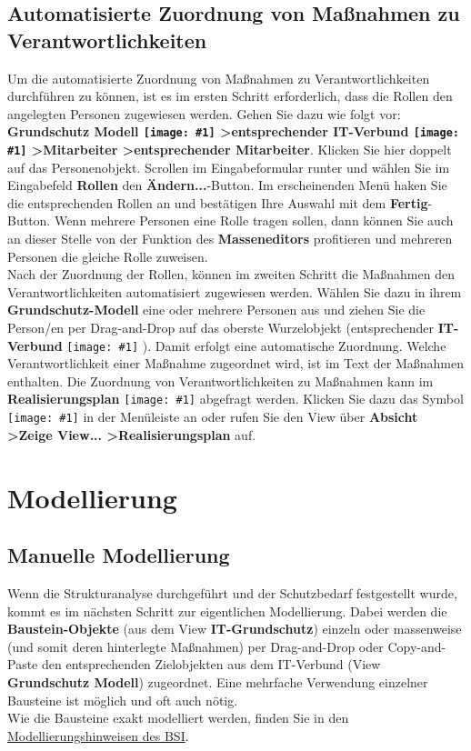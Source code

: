 \documentclass[a4paper,10pt]{book}
\newcommand{\icon}[1]{\texttt{[image: \#1]}}
\begin{document}
\subsection{Automatisierte Zuordnung von Maßnahmen zu Verantwortlichkeiten}
Um die automatisierte Zuordnung von Maßnahmen zu Verantwortlichkeiten durchführen zu können, ist es im ersten Schritt erforderlich, dass die Rollen den angelegten Personen zugewiesen werden. Gehen Sie dazu wie folgt vor: \textbf{Grundschutz Modell \icon{Icon/GS_Modell.png} \textgreater entsprechender IT-Verbund \icon{Icon/GS_Modell.png} \textgreater Mitarbeiter \textgreater entsprechender Mitarbeiter}. Klicken Sie hier doppelt auf das Personenobjekt. Scrollen im Eingabeformular runter und wählen Sie im Eingabefeld \textbf{Rollen} den \textbf{Ändern...}-Button. Im erscheinenden Menü haken Sie die entsprechenden Rollen an und bestätigen Ihre Auswahl mit dem \textbf{Fertig}-Button. Wenn mehrere Personen eine Rolle tragen sollen, dann können Sie auch an dieser Stelle von der Funktion des \textbf{Masseneditors} profitieren und mehreren Personen die gleiche Rolle zuweisen.
\newline\\
Nach der Zuordnung der Rollen, können im zweiten Schritt die Maßnahmen den Verantwortlichkeiten automatisiert zugewiesen werden. Wählen Sie dazu in ihrem \textbf{Grundschutz-Modell} eine oder mehrere Personen aus und ziehen Sie die Person/en per Drag-and-Drop auf das oberste Wurzelobjekt (entsprechender \textbf{IT-Verbund} \icon{Icon/GS_Modell.png} ). Damit erfolgt eine automatische Zuordnung. Welche Verantwortlichkeit einer Maßnahme zugeordnet wird, ist im Text der Maßnahmen enthalten.
Die Zuordnung von Verantwortlichkeiten zu Maßnahmen kann im \textbf{Realisierungsplan} \icon{Icon/Okay.png} abgefragt werden. Klicken Sie dazu das Symbol \icon{Icon/Okay.png} in der Menüleiste an oder rufen Sie den View über \textbf{Absicht \textgreater Zeige View... \textgreater Realisierungsplan} auf.

\section{Modellierung}

\subsection{Manuelle Modellierung}
Wenn die Strukturanalyse durchgeführt und der Schutzbedarf festgestellt wurde, kommt es im nächsten Schritt zur eigentlichen
Modellierung. Dabei werden die \textbf{Baustein-Objekte} (aus dem View \textbf{IT-Grundschutz}) einzeln oder massenweise
(und somit deren hinterlegte Maßnahmen) per Drag-and-Drop oder Copy-and-Paste den entsprechenden Zielobjekten aus dem IT-Verbund
(View \textbf{Grundschutz Modell}) zugeordnet. Eine mehrfache Verwendung einzelner Bausteine ist möglich und oft auch nötig.
\newline\\
Wie die Bausteine exakt modelliert werden, finden Sie in den
\href{https://www.bsi.bund.de/ContentBSI/grundschutz/kataloge/allgemein/modellierung/02001.html}{Modellierungshinweisen des BSI}.
\end{document}
